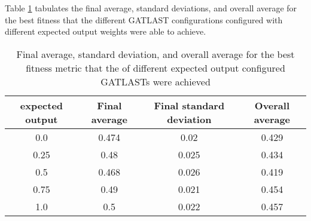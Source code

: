 Table \ref{tab:HP:GA:ExpectedOutput:best fitness} tabulates the final average, standard deviations, and overall average for the best fitness that the different GATLAST configurations configured with different expected output weights were able to achieve.
\begin{table}[tbh!]
\centering
\begin{adjustbox}{trim=0cm 0cm 0cm 0cm, clip=true}
\begin{tabular}{|c|c|c|c|}
\hline
expected output & Final average & Final standard deviation & Overall average\\
\hline
0.0 & 0.474 & 0.02 & 0.429\\\hline
0.25 & 0.48 & 0.025 & 0.434\\\hline
0.5 & 0.468 & 0.026 & 0.419\\\hline
0.75 & 0.49 & 0.021 & 0.454\\\hline
1.0 & 0.5 & 0.022 & 0.457\\\hline
\end{tabular}
\end{adjustbox}
\caption{Final average, standard deviation, and overall average for the best fitness metric that the of different expected output configured GATLASTs were achieved}
\label{tab:HP:GA:ExpectedOutput:best fitness}
\end{table}